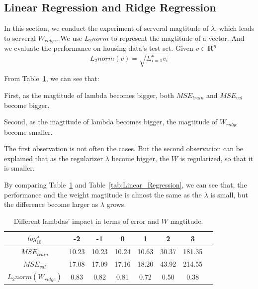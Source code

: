 \documentclass[journal, a4paper]{IEEEtran}
\begin{document}
\subsection{Linear Regression and Ridge Regression}
In this section, we conduct the experiment of serveral magtitude of $\lambda$, which leads to serveral $W_{ridge}$. We use $L_2{norm}$ to represent the magtitude of a vector. And we evaluate the performance on housing data's test set. Given $v \in \mathbf{R}^{n}$
\begin{equation}
	L_2norm(v) = \sqrt{\Sigma_{i=1}^{n} v_{i}}
\end{equation} \par
From Table~\ref{tab:Ridge_Regression}, we can see that: \par
First, as the magtitude of lambda becomes bigger, both $MSE_{train}$ and $MSE_{val}$ become bigger. \par
Second, as the magtitude of lambda becomes bigger, the magtitude of $W_{ridge}$ become smaller. \par
The first observation is not often the cases. But the second observation can be explained that as the regularizer $\lambda$ become bigger, the $W$ is regularized, so that it is smaller. \par
By comparing Table~\ref{tab:Ridge_Regression} and Table~\ref{tab:Linear_Regression}, we can see that, the performance and the weight magtitude is almost the same as the $\lambda$ is small, but the difference become larger as $\lambda$ grows.
\begin{table}[!hbt]
	\begin{center}
		\caption{Different lambdas' impact in terms of error and $W$ magtitude.}
		\label{tab:Ridge_Regression}
		\begin{tabular}{|c|c|c|c|c|c|c|c|}
			\hline
			$log_{10}^{\lambda}$ & -2 & -1 & 0 & 1 & 2 & 3 \\
			\hline
			$MSE_{train}$   & 10.23 & 10.23 & 10.24 & 10.63 & 30.37 & 181.35   \\
			\hline
			$MSE_{val}$  & 17.08 & 17.09 & 17.16 & 18.20 & 43.92 & 214.55   \\
			\hline
			$L_2norm(W_{ridge})$  & 0.83 & 0.82 & 0.81 & 0.72 & 0.50 & 0.38 \\
			\hline
		\end{tabular}
	\end{center}
\end{table}
\end{document}
